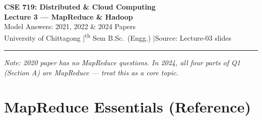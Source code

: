 \documentclass[12pt, a4paper]{article}
\begin{document}
\begin{center}
  {\LARGE\bfseries\color{sectionblue} CSE 719: Distributed \& Cloud Computing}\\[0.5em]
  {\Large\bfseries Lecture 3 --- MapReduce \& Hadoop}\\[0.3em]
  {\large Model Answers: 2021, 2022 \& 2024 Papers}\\[0.2em]
  {\small University of Chittagong \quad|\textsuperscript{th} Sem B.Sc.\ (Engg.)
  \quad|\quad Source: Lecture-03 slides}
\end{center}
\vspace{0.3em}\noindent\rule{\linewidth}{1pt}\vspace{0.5em}

\noindent\textit{Note: 2020 paper has no MapReduce questions.
In 2024, all four parts of Q1 (Section A) are MapReduce --- treat this as a core topic.}

\tableofcontents
\newpage

\section{MapReduce Essentials (Reference)}
\end{document}
